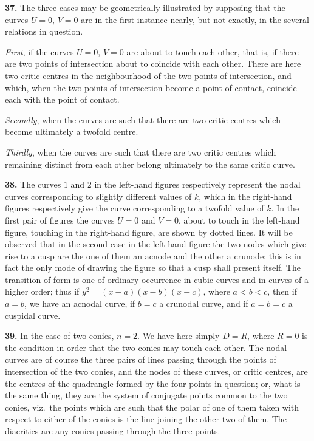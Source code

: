 \documentclass[11pt,a4paper]{article}
\begin{document}
\medskip

\textbf{37.} The three cases may be geometrically illustrated by supposing that the curves $U = 0$, $V = 0$ are in the first instance nearly, but not exactly, in the several relations in question.

\emph{First}, if the curves $U = 0$, $V = 0$ are about to touch each other, that is, if there are two points of intersection about to coincide with each other. There are here two critic centres in the neighbourhood of the two points of intersection, and which, when the two points of intersection become a point of contact, coincide each with the point of contact.

\emph{Secondly}, when the curves are such that there are two critic centres which become ultimately a twofold centre.

\emph{Thirdly}, when the curves are such that there are two critic centres which remaining distinct from each other belong ultimately to the same critic curve.

\medskip

\textbf{38.} The curves $1$ and $2$ in the left-hand figures respectively represent the nodal curves corresponding to slightly different values of $k$, which in the right-hand figures respectively give the curve corresponding to a twofold value of $k$. In the first pair of figures the curves $U = 0$ and $V = 0$, about to touch in the left-hand figure, touching in the right-hand figure, are shown by dotted lines. It will be observed that in the second case in the left-hand figure the two nodes which give rise to a cusp are the one of them an acnode and the other a crunode; this is in fact the only mode of drawing the figure so that a cusp shall present itself. The transition of form is one of ordinary occurrence in cubic curves and in curves of a higher order; thus if $y^2 = (x - a)(x - b)(x - c)$, where $a < b < c$, then if $a = b$, we have an acnodal curve, if $b = c$ a crunodal curve, and if $a = b = c$ a cuspidal curve.

\medskip

\textbf{39.} In the case of two conies, $n = 2$. We have here simply $D = R$, where $R = 0$ is the condition in order that the two conies may touch each other. The nodal curves are of course the three pairs of lines passing through the points of intersection of the two conies, and the nodes of these curves, or critic centres, are the centres of the quadrangle formed by the four points in question; or, what is the same thing, they are the system of conjugate points common to the two conies, viz.\ the points which are such that the polar of one of them taken with respect to either of the conies is the line joining the other two of them. The diacritics are any conies passing through the three points.
\end{document}
